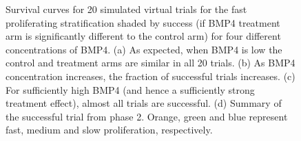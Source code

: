 \documentclass[
  default,
]{sn-jnl}
\begin{document}
\begin{figure}
\begin{minipage}{0.50\linewidth}
{}

\subcaption{\label{fig-ex-4}}

\end{minipage}%
%
\begin{minipage}{0.50\linewidth}


\subcaption{\label{fig-phase2_trial_summary}}

\end{minipage}%

\caption{\label{fig-Identical_mid_KM}Survival curves for 20 simulated
virtual trials for the fast proliferating stratification shaded by
success (if BMP4 treatment arm is significantly different to the control
arm) for four different concentrations of BMP4. (a) As expected, when
BMP4 is low the control and treatment arms are similar in all 20 trials.
(b) As BMP4 concentration increases, the fraction of successful trials
increases. (c) For sufficiently high BMP4 (and hence a sufficiently
strong treatment effect), almost all trials are successful. (d) Summary
of the successful trial from phase 2. Orange, green and blue represent
fast, medium and slow proliferation, respectively.}

\end{figure}%
\end{document}
